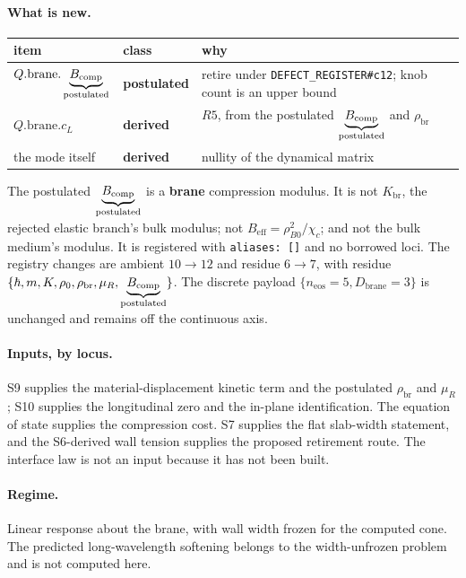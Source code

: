 \paragraph{What is new.}
\begin{center}
\begin{tabular}{@{}lll@{}}
\toprule
item & class & why \\
\midrule
\(Q.\mathrm{brane}.\underbrace{B_{\mathrm{comp}}}_{\text{\scriptsize postulated}}\) & \textbf{postulated} & retire under
\texttt{DEFECT\_REGISTER\#c12}; knob count is an upper bound \\
\(Q.\mathrm{brane}.c_L\) & \textbf{derived} & \(R5\), from the postulated
\(\underbrace{B_{\mathrm{comp}}}_{\text{\scriptsize postulated}}\) and \(\rho_{\mathrm{br}}\) \\
the mode itself & \textbf{derived} & nullity of the dynamical matrix \\
\bottomrule
\end{tabular}
\end{center}

\noindent
The postulated \(\underbrace{B_{\mathrm{comp}}}_{\text{\scriptsize postulated}}\) is a \textbf{brane} compression modulus. It is not
\(K_{\mathrm{br}}\), the rejected elastic branch's bulk modulus; not
\(B_{\mathrm{eff}}=\rho_{B0}^2/\chi_c\); and not the bulk medium's modulus. It
is registered with \texttt{aliases: []} and no borrowed loci. The registry
changes are ambient \(10\mathbin{\to}12\) and residue \(6\mathbin{\to}7\), with
residue
\(\{\hbar,m,K,\rho_0,\rho_{\mathrm{br}},\mu_R,\underbrace{B_{\mathrm{comp}}}_{\text{\scriptsize postulated}}\}\). The discrete
payload \(\{n_{\mathrm{eos}}=5,D_{\mathrm{brane}}=3\}\) is unchanged and
remains off the continuous axis.

\paragraph{Inputs, by locus.}
S9 supplies the material-displacement kinetic term and the postulated
\(\rho_{\mathrm{br}}\) and \(\mu_R\); S10 supplies the longitudinal zero and
the in-plane identification. The equation of state supplies the compression
cost. S7 supplies the flat slab-width statement, and the S6-derived wall
tension supplies the proposed retirement route. The interface law is not an
input because it has not been built.

\paragraph{Regime.}
Linear response about the brane, with wall width frozen for the computed cone.
The predicted long-wavelength softening belongs to the width-unfrozen problem
and is not computed here.

